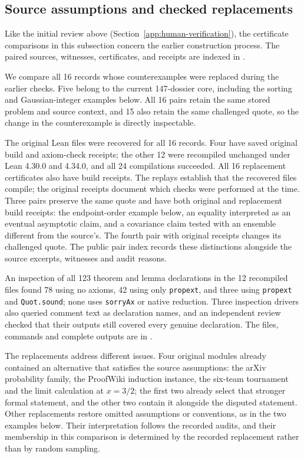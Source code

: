 \subsection{Source assumptions and checked replacements}
\label{app:source-admissibility}
\label{app:matched-admission-pairs}

Like the initial review above (Section~\ref{app:human-verification}), the certificate comparisons in this subsection concern the earlier construction process. The paired sources, witnesses, certificates, and receipts are indexed in .

We compare all 16 records whose counterexamples were replaced during the earlier checks. Five belong to the current 147-dossier core, including the sorting and Gaussian-integer examples below. All 16 pairs retain the same stored problem and source context, and 15 also retain the same challenged quote, so the change in the counterexample is directly inspectable.

The original Lean files were recovered for all 16 records. Four have saved original build and axiom-check receipts; the other 12 were recompiled unchanged under Lean 4.30.0 and 4.34.0, and all 24 compilations succeeded. All 16 replacement certificates also have build receipts. The replays establish that the recovered files compile; the original receipts document which checks were performed at the time. Three pairs preserve the same quote and have both original and replacement build receipts: the endpoint-order example below, an equality interpreted as an eventual asymptotic claim, and a covariance claim tested with an ensemble different from the source's. The fourth pair with original receipts changes its challenged quote. The public pair index records these distinctions alongside the source excerpts, witnesses and audit reasons.

An inspection of all 123 theorem and lemma declarations in the 12 recompiled files found 78 using no axioms, 42 using only \texttt{propext}, and three using \texttt{propext} and \texttt{Quot.sound}; none uses \texttt{sorryAx} or native reduction. Three inspection drivers also queried comment text as declaration names, and an independent review checked that their outputs still covered every genuine declaration. The files, commands and complete outputs are in .

The replacements address different issues. Four original modules already contained an alternative that satisfies the source assumptions: the arXiv probability family, the ProofWiki induction instance, the six-team tournament and the limit calculation at $x=3/2$; the first two already select that stronger formal statement, and the other two contain it alongside the disputed statement. Other replacements restore omitted assumptions or conventions, as in the two examples below. Their interpretation follows the recorded audits, and their membership in this comparison is determined by the recorded replacement rather than by random sampling.

